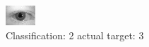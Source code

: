 \begin{figure}[h!]
\begin{center}
\includegraphics[width=0.60\columnwidth]{figures/ID614_class_2_target_3.png}
\end{center}
\caption{ Classification: 2 actual target: 3}
\label{fig:ID614_class_2_target_3}
\end{figure}
